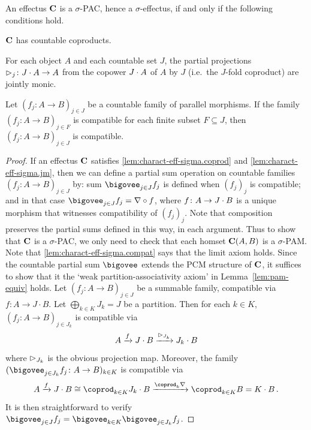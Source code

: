 \documentclass[%
	submission,
copyright,creativecommons,UKenglish]{eptcs}
\begin{document}
\begin{Auxproof}
\begin{lemma}
\label{lem:charact-eff-sigma}
An effectus $\mathbf{C}$
is a $\sigma$-PAC, hence a $\sigma$-effectus,
if and only if the following conditions hold.
\begin{myenum}
\item\label{lem:charact-eff-sigma.coprod}
$\mathbf{C}$ has countable coproducts.
\item\label{lem:charact-eff-sigma.jm}
For each object $A$
and each countable set $J$,
the partial projections
$\mathord{\vartriangleright}_j\colon J \cdot A\to A$
from the copower $J \cdot A$ of $A$ by $J$
(i.e.\ the $J$-fold coproduct) are jointly monic.
\item\label{lem:charact-eff-sigma.compat}
Let $(f_j\colon A\to B)_{j\in J}$
be a countable family of parallel morphisms.
If the family $(f_j\colon A\to B)_{j\in F}$
is compatible for each finite subset $F\subseteq J$,
then $(f_j\colon A\to B)_{j\in J}$ is compatible.
\end{myenum}
\end{lemma}
\begin{proof}
If an effectus $\mathbf{C}$ satisfies
\ref{lem:charact-eff-sigma.coprod} and \ref{lem:charact-eff-sigma.jm},
then we can define a partial sum operation
on countable families $(f_j\colon A\to B)_{j\in J}$
by:
sum $\bigovee_{j\in J} f_j$
is defined when $(f_j)_j$ is compatible;
and in that case
$\bigovee_{j\in J} f_j=\nabla\circ f$,
where $f\colon A\to J\cdot B$
is a unique morphism that witnesses compatibility
of $(f_j)_j$.
Note that composition
preserves the partial sums defined in this way,
in each argument.
Thus to show that $\mathbf{C}$ is a $\sigma$-PAC,
we only need to check that each homset $\mathbf{C}(A,B)$
is a $\sigma$-PAM.
Note that \ref{lem:charact-eff-sigma.compat}
says that the limit axiom holds.
Since the countable partial sum $\bigovee$
extends the PCM structure of $\mathbf{C}$,
it suffices to show that it the
`weak partition-associativity axiom'
in Lemma~\ref{lem:pam-equiv} holds.
Let $(f_j\colon A\to B)_{j\in J}$ be a summable family,
compatible via $f\colon A\to J\cdot B$.
Let $\bigoplus_{k\in K} J_k=J$ be a partition.
Then for each $k\in K$,
$(f_j\colon A\to B)_{j\in J_k}$ is compatible
via
\[
A\xrightarrow{f} J\cdot B
\xrightarrow{\mathord{\vartriangleright}_{J_k}}
J_k\cdot B
\]
where $\mathord{\vartriangleright}_{J_k}$ is the obvious projection map.
Moreover, the family
$(\bigovee_{j\in J_k} f_j\colon A\to B)_{k\in K}$
is compatible via
\[
A\xrightarrow{f} J\copow B
\cong \coprod_{k\in K} J_k\copow B
\xrightarrow{\coprod_k \nabla}
\coprod_{k\in K} B
= K\copow B
\mpunct.
\]
It is then straightforward to verify
$\bigovee_{j\in J} f_j
=
\bigovee_{k\in K}
\bigovee_{j\in J_k} f_j$.
\end{proof}
\end{Auxproof}
\end{document}
